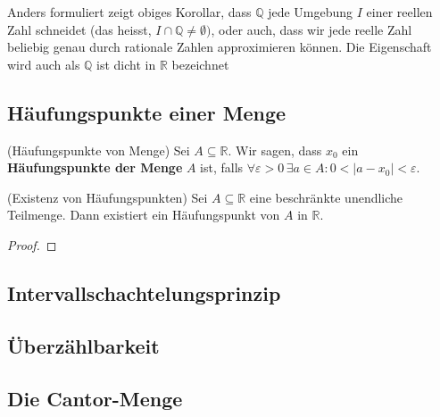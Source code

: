 \documentclass[../Analysis1_script.tex]{subfiles}
\begin{document}
Anders formuliert zeigt obiges Korollar, dass $\mathbb {Q}$ jede Umgebung $I$ einer reellen Zahl schneidet (das heisst, $I \cap \mathbb {Q} \neq \emptyset)$, oder auch, dass wir jede reelle Zahl beliebig genau durch rationale Zahlen approximieren können. Die Eigenschaft wird auch als $\mathbb {Q}$ ist dicht in $\mathbb {R}$ bezeichnet

\subsection{Häufungspunkte einer Menge}

\begin{definition}{(Häufungspunkte von Menge)}
	Sei $A \subseteq \mathbb{R}$. Wir sagen, dass $x_0$ ein \textbf{Häufungspunkte der Menge} $A$ ist, falls $\forall \varepsilon > 0 \, \exists a \in A: 0 < |a - x_0| < \varepsilon$. 
\end{definition}

\begin{proposition}{(Existenz von Häufungspunkten)}
	Sei $A\subseteq \mathbb {R}$ eine beschränkte unendliche Teilmenge. Dann existiert ein Häufungspunkt von $A$ in $\mathbb {R}$. 
\end{proposition}

\def\svgwidth{\columnwidth}


\begin{proof}
\end{proof}

\subsection{Intervallschachtelungsprinzip}

\subsection{Überzählbarkeit}

\subsection{Die Cantor-Menge}
\end{document}
